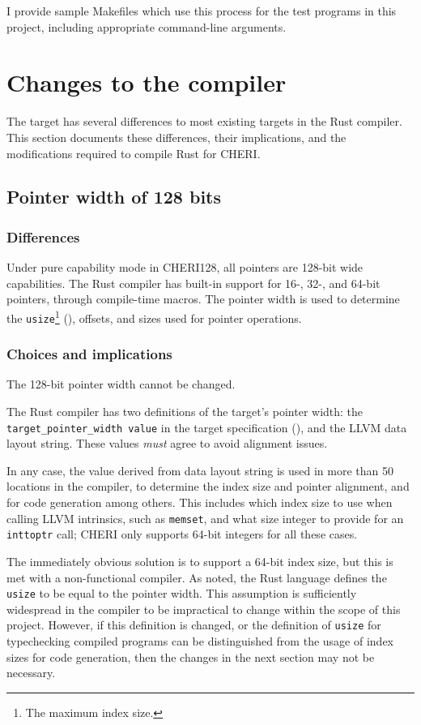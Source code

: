 \documentclass[dissertation.tex]{subfiles}
\begin{document}
I provide sample Makefiles which use this process for the test programs
in this project, including appropriate command-line arguments.


\section{Changes to the compiler}
\label{sec:impl-div-compiler}

The \cuf target has several differences to most existing targets in the
Rust compiler.
This section documents these differences, their implications, and the
modifications required to compile Rust for CHERI.


\subsection{Pointer width of 128 bits}
\label{sec:impl-width}

\subsubsection{Differences}
Under pure capability mode in CHERI128, all pointers are 128-bit wide
capabilities.
The Rust compiler has built-in support for 16-, 32-, and 64-bit
pointers, through compile-time macros.
The pointer width is used to determine the \texttt{usize}\footnote{The
maximum index size.} (), offsets, and sizes used
for pointer operations.

\subsubsection{Choices and implications}
The 128-bit pointer width cannot be changed.

The Rust compiler has two definitions of the target's pointer width: the
\texttt{target\_pointer\_width value} in the target specification
(), and the LLVM data layout string.
These values \emph{must} agree to avoid alignment issues.

In any case, the value derived from data layout string is used in more
than 50 locations in the compiler, to determine the index size and
pointer alignment, and for code generation among others.
This includes which index size to use when calling LLVM intrinsics, such
as \texttt{memset}, and what size integer to provide for an
\texttt{inttoptr} call; CHERI only supports 64-bit integers for all
these cases.

The immediately obvious solution is to support a 64-bit index size, but
this is met with a non-functional compiler.
As  noted, the Rust language defines the
\texttt{usize} to be equal to the pointer width.
This assumption is sufficiently widespread in the compiler to be
impractical to change within the scope of this project.
However, if this definition is changed, or the definition of
\texttt{usize} for typechecking compiled programs can be distinguished
from the usage of index sizes for code generation, then the changes in
the next section may not be necessary.
\end{document}

